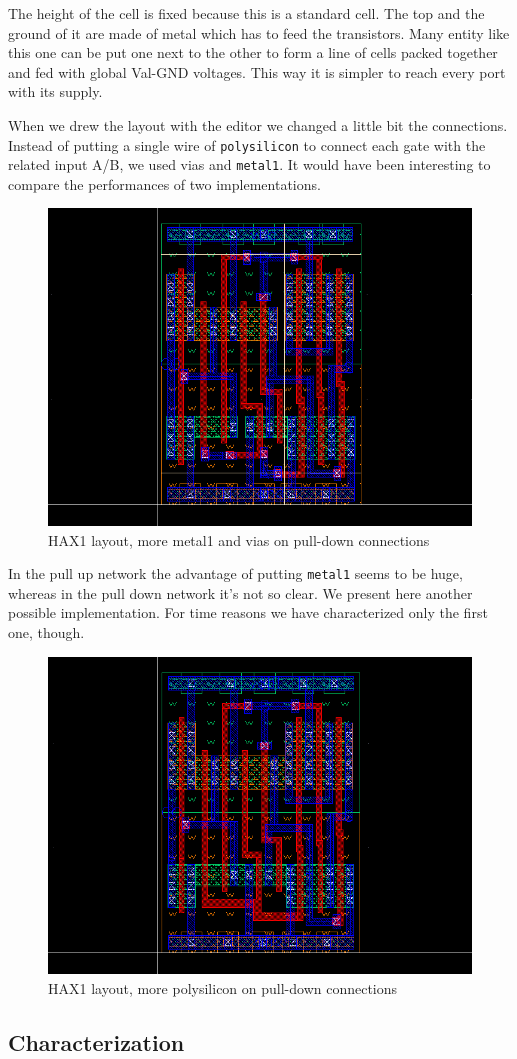 \documentclass[a4paper]{article}
\begin{document}
The height of the cell is fixed because this is a standard cell. The top and the ground of it are made of metal which has to feed the transistors. Many entity like this one can be put one next to the other to form a line of cells packed together and fed with global Val-GND voltages. This way it is simpler to reach every port with its supply.

When we drew the layout with the editor we changed a little bit the connections. Instead of putting a single wire of \texttt{polysilicon} to connect each gate with the related input A/B, we used vias and \texttt{metal1}. It would have been interesting to compare the performances of two implementations.

\begin{figure}[H]
      \centering
       \includegraphics[width=12cm]{./Images/HA/HAX1_poly-metal_layout.png}
\caption{HAX1 layout, more metal1 and vias on pull-down connections}
\label{fig: HAX1_lay_drw}
\end{figure}

In the pull up network the advantage of putting \texttt{metal1} seems to be huge, whereas in the pull down network it's not so clear. We present here another possible implementation. For time reasons we have characterized only the first one, though.

\begin{figure}[H]
      \centering
       \includegraphics[width=12cm]{./Images/HA/HAX1_poly_layout.png}
\caption{HAX1 layout, more polysilicon on pull-down connections}
\label{fig: HAX1_layPoly_drw}
\end{figure}

\subsection{Characterization}
\end{document}
